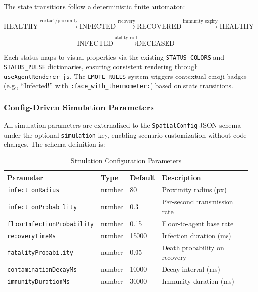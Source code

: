 The state transitions follow a deterministic finite automaton:

\begin{equation}
\text{HEALTHY} \xrightarrow{\text{contact/proximity}} \text{INFECTED} \xrightarrow{\text{recovery}} \text{RECOVERED} \xrightarrow{\text{immunity expiry}} \text{HEALTHY}
\end{equation}

\begin{equation}
\text{INFECTED} \xrightarrow{\text{fatality roll}} \text{DECEASED}
\end{equation}

Each status maps to visual properties via the existing \texttt{STATUS\_COLORS} and \texttt{STATUS\_PULSE} dictionaries, ensuring consistent rendering through \texttt{useAgentRenderer.js}. The \texttt{EMOTE\_RULES} system triggers contextual emoji badges (e.g., ``Infected!'' with \texttt{:face\_with\_thermometer:}) based on state transitions.

\subsubsection{Config-Driven Simulation Parameters}
\label{sec:config-parameters}

All simulation parameters are externalized to the \texttt{SpatialConfig} JSON schema under the optional \texttt{simulation} key, enabling scenario customization without code changes. The schema definition is:

\begin{table}[h]
\centering
\caption{Simulation Configuration Parameters}
\label{tab:sim-params}
\begin{tabular}{@{}llll@{}}
\toprule
Parameter & Type & Default & Description \\
\midrule
\texttt{infectionRadius} & number & 80 & Proximity radius (px) \\
\texttt{infectionProbability} & number & 0.3 & Per-second transmission rate \\
\texttt{floorInfectionProbability} & number & 0.15 & Floor-to-agent base rate \\
\texttt{recoveryTimeMs} & number & 15000 & Infection duration (ms) \\
\texttt{fatalityProbability} & number & 0.05 & Death probability on recovery \\
\texttt{contaminationDecayMs} & number & 10000 & Decay interval (ms) \\
\texttt{immunityDurationMs} & number & 30000 & Immunity duration (ms) \\
\bottomrule
\end{tabular}
\end{table}

